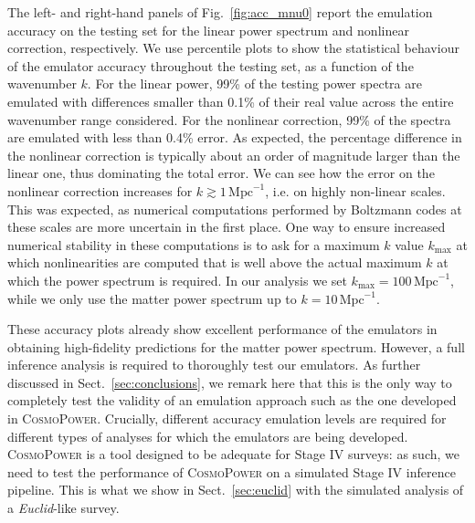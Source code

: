 \documentclass[fleqn,usenatbib]{mnras}
\begin{document}
The left- and right-hand panels of Fig.~\ref{fig:acc_mnu0} report the emulation accuracy on the testing set for the linear power spectrum and nonlinear correction, respectively. We use percentile plots to show the statistical behaviour of the emulator accuracy throughout the testing set, as a function of the wavenumber $k$. For the linear power, 99\% of the testing power spectra are emulated with differences smaller than 0.1\% of their real value across the entire wavenumber range considered. For the nonlinear correction, 99\% of the spectra are emulated with less than 0.4\% error. As expected, the percentage difference in the nonlinear correction is typically about an order of magnitude larger than the linear one, thus dominating the total error. We can see how the error on the nonlinear correction increases for $k \gtrsim 1 \, \mathrm{Mpc}^{-1}$, i.e. on highly non-linear scales. This was expected, as numerical computations performed by Boltzmann codes at these scales are more uncertain in the first place. One way to ensure increased numerical stability in these computations is to ask for a maximum $k$ value $k_{\mathrm{max}}$ at which nonlinearities are computed that is well above the actual maximum $k$ at which the power spectrum is required. In our analysis we set $k_{\mathrm{max}}=100 \, \mathrm{Mpc}^{-1}$, while we only use the matter power spectrum up to $k = 10 \, \mathrm{Mpc}^{-1}$. 

These accuracy plots already show excellent performance of the emulators in obtaining high-fidelity predictions for the matter power spectrum. However, a full inference analysis is required to thoroughly test our emulators. As further discussed in Sect.~\ref{sec:conclusions}, we remark here that this is the only way to completely test the validity of an emulation approach such as the one developed in \textsc{CosmoPower}. Crucially, different accuracy emulation levels are required for different types of analyses for which the emulators are being developed. \textsc{CosmoPower} is a tool designed to be adequate for Stage IV surveys: as such, we need to test the performance of \textsc{CosmoPower} on a simulated Stage IV inference pipeline. This is what we show in Sect.~\ref{sec:euclid} with the simulated analysis of a \textit{Euclid}-like survey.
\end{document}
